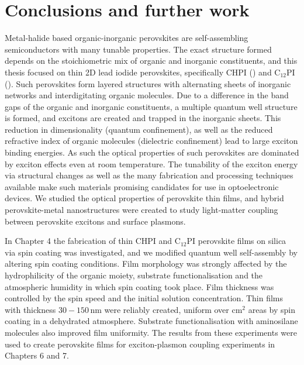 
\chapter{Conclusions and further work}

\graphicspath{{Chapter8/Figures/}}

Metal-halide based organic-inorganic perovskites are self-assembling semiconductors with many tunable properties. The exact structure formed depends on the stoichiometric mix of organic and inorganic constituents, %
and this thesis focused on thin 2D lead iodide perovskites, specifically CHPI () and C$_{12}$PI (). %
Such perovskites form layered structures with alternating sheets of inorganic  networks and interdigitating organic molecules. Due to a difference in the band gaps of the organic and inorganic constituents, a multiple quantum well structure is formed, and excitons are created and trapped in the inorganic sheets. This reduction in dimensionality (quantum confinement), as well as the reduced refractive index of organic molecules (dielectric confinement) lead to large exciton binding energies. As such the optical properties of such perovskites are dominated by exciton effects even at room temperature. The tunability of the exciton energy via structural changes as well as the many fabrication and processing techniques available make such materials promising candidates for use in optoelectronic devices. We studied the optical properties of perovskite thin films, and hybrid perovskite-metal nanostructures were created to study light-matter coupling between perovskite excitons and surface plasmons.

In Chapter 4 the fabrication of thin CHPI and C$_{12}$PI perovskite films on silica via spin coating was investigated, %
and we modified quantum well self-assembly by altering spin coating conditions. Film morphology was strongly affected by the hydrophilicity of the organic moiety, substrate functionalisation and the atmospheric humidity in which spin coating took place. Film thickness was controlled by the spin speed and the initial solution concentration. Thin films with thickness $30-150$\,nm were reliably created, uniform over cm$^2$ areas by spin coating in a dehydrated atmosphere. Substrate functionalisation with aminosilane molecules also improved film uniformity. The results from these experiments were used to create perovskite films for exciton-plasmon coupling experiments in Chapters 6 and 7.%

